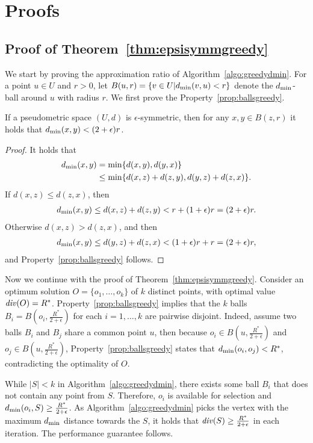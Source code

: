 \section{Proofs}
\subsection{Proof of Theorem~\ref{thm:epsisymmgreedy}}
We start by proving the approximation ratio of Algorithm~\ref{algo:greedydmin}.
For a point $u \in U$ and $r>0$, let $B(u,r) = \{v \in U | d_{\text{min}}(v,u) < r\}$ denote the $d_{\text{min}}$-ball around $u$ with radius $r$.
We first prove the Property~\ref{prop:ballsgreedy}.
\begin{prop}
\label{prop:ballsgreedy}
If a pseudometric space $(U,d)$ is $\epsilon$-symmetric, then for any $x,y \in B(z,r)$ it holds that $d_{\text{min}}(x,y) < (2+\epsilon)r$.
\end{prop}
\begin{proof}
It holds that
\begin{align*}
d_{\text{min}}(x,y) &= \min\{d(x,y),d(y,x)\} \\
&\leq \min\{d(x,z)+d(z,y),d(y,z)+d(z,x)\}.
\end{align*}
If $d(x,z) \leq d(z,x)$, then 
\begin{align*}
d_{\text{min}}(x,y) \leq d(x,z)+d(z,y) < r + (1+\epsilon)r = (2+\epsilon)r.
\end{align*}
Otherwise $d(x,z) > d(z,x)$, and then
\begin{align*}
d_{\text{min}}(x,y) \leq d(y,z)+d(z,x) < (1+\epsilon)r + r = (2+\epsilon)r,
\end{align*}
and Property~\ref{prop:ballsgreedy} follows.
\end{proof}
Now we continue with the proof of Theorem~\ref{thm:epsisymmgreedy}.
Consider an optimum solution $O=\{o_1,\ldots,o_k\}$ of $k$ distinct points, with optimal value $\diver{O } = R^*$.
Property~\ref{prop:ballsgreedy} implies that the $k$ balls $B_i = B(o_i,\frac{R^*}{2+\epsilon})$ for each $i=1,\ldots,k$ are pairwise disjoint. Indeed, assume two balls $B_i$ and $B_j$ share a common point $u$, then because $o_i \in B(u,\frac{R^*}{2+\epsilon})$ and $o_j \in B(u,\frac{R^*}{2+\epsilon})$, Property~\ref{prop:ballsgreedy} states that $d_{\text{min}}(o_i,o_j)<R^*$, contradicting the optimality of $O$.

While $|S|<k$ in Algorithm~\ref{algo:greedydmin}, there exists some ball $B_i$ that does not contain any point from $S$. Therefore, $o_i$ is available for selection and $d_{\text{min}}(o_i,S) \geq \frac{R^*}{2+\epsilon}$. As Algorithm~\ref{algo:greedydmin} picks the vertex with the maximum $d_{\text{min}}$ distance towards the $S$, it holds that $\diver{S}\geq \frac{R^*}{2+\epsilon}$ in each iteration. The performance guarantee follows. 

